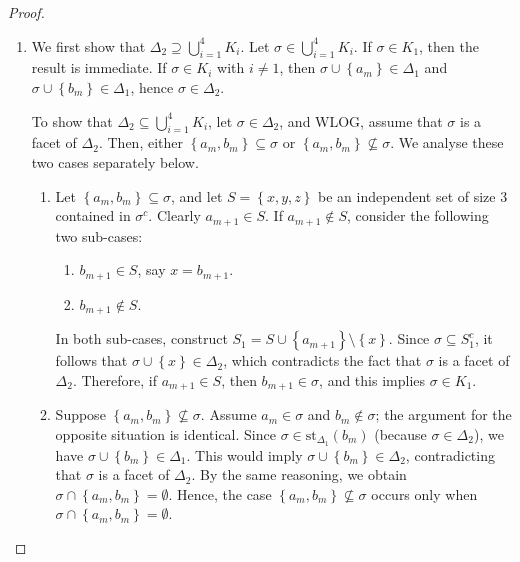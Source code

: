 \documentclass[11pt,reqno,a4paper]{amsart}
\theoremstyle{definition}
\theoremstyle{theorem}
\newcommand{\lno}{\left(}
\newcommand{\rno}{\right)}
\newcommand{\lcu}{\left\{}
\newcommand{\rcu}{\right\}}
\newcommand{\st}{\mathrm{st}}
\theoremstyle{remark}
\begin{document}
\begin{proof}
    \begin{enumerate}
        \item We first show that $\Delta_{2} \supseteq \bigcup\limits_{i=1}^4{K_i}$. 
        Let $\sigma \in \bigcup\limits_{i=1}^4{K_i}$. If $\sigma \in K_1$, then the result is immediate. If $\sigma \in K_i$ with $i\neq1$, then $\sigma \cup \lcu a_m \rcu\in \Delta_1$ and $\sigma \cup \lcu b_m \rcu \in \Delta_1$, hence $\sigma \in \Delta_2$.

        To show that $\Delta_{2} \subseteq \bigcup\limits_{i=1}^4{K_i}$, let $\sigma \in \Delta_2$, and WLOG, assume that $\sigma$ is a facet of $\Delta_2$. Then, either $\lcu a_m, b_m\rcu \subseteq \sigma$ or $\lcu a_m, b_m\rcu \not\subseteq \sigma$. We analyse these two cases separately below.

        \begin{enumerate}[label = \Alph*.]
    \item Let $\lcu a_m, b_m \rcu \subseteq \sigma$, and let $S = \lcu x, y, z \rcu$ be an independent set of size $3$ contained in $\sigma^c$. Clearly $a_{m+1} \in S$. If $a_{m+1} \notin S$, consider the following two sub-cases:
    \begin{enumerate}[label = \roman*.]
        \item $b_{m+1} \in S$, say $x = b_{m+1}$.
        \item $b_{m+1} \notin S$.
    \end{enumerate}

    In both sub-cases, construct $S_1 = S \cup \lcu a_{m+1} \rcu \setminus \lcu x \rcu.$ 
    Since $\sigma \subseteq S_1^c$, it follows that $\sigma \cup \lcu x \rcu \in \Delta_2$, which contradicts the fact that $\sigma$ is a facet of $\Delta_2$. Therefore, if $a_{m+1} \in S$, then $b_{m+1} \in \sigma$, and this implies $\sigma \in K_1$.

    \item Suppose $\lcu a_m, b_m \rcu \not\subseteq \sigma$. Assume $a_m \in \sigma$ and $b_m \notin \sigma$; the argument for the opposite situation is identical. Since $\sigma \in \st_{\Delta_1}\lno b_m\rno$ (because $\sigma \in \Delta_2$), we have $\sigma \cup \lcu b_m \rcu \in \Delta_1$. This would imply $\sigma \cup \lcu b_m \rcu \in \Delta_2$, contradicting that $\sigma$ is a facet of $\Delta_2$. By the same reasoning, we obtain $\sigma \cap \lcu a_m, b_m \rcu = \emptyset$. Hence, the case $\lcu a_m, b_m \rcu \not\subseteq \sigma$ occurs only when $\sigma \cap \lcu a_m, b_m \rcu = \emptyset$.


\end{enumerate}
\end{enumerate}
\end{proof}
\end{document}
